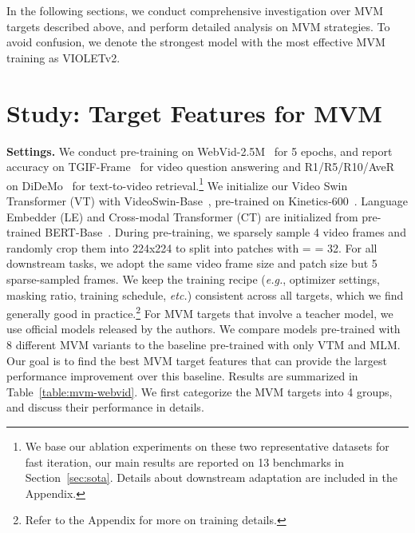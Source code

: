 \documentclass[10pt,twocolumn,letterpaper]{article}
\newcommand{\modelname}{VIOLETv2\xspace}
\begin{document}
In the following sections, we conduct comprehensive investigation over MVM targets described above, and perform detailed analysis on MVM strategies. To avoid confusion, we denote the strongest model with the most effective MVM training as \modelname. \section{Study: Target Features for MVM} \label{sec:study}
\noindent \textbf{Settings.} We conduct pre-training on WebVid-2.5M~\cite{bain2021frozen} for 5 epochs, and report accuracy on TGIF-Frame~\cite{jang2017tgif-qa} for video question answering and R1/R5/R10/AveR on DiDeMo~\cite{hendricks2017didemo} for text-to-video retrieval.\footnote{We base our ablation experiments on these two representative datasets for fast iteration, our main results are reported on 13 benchmarks in Section~\ref{sec:sota}. Details about downstream adaptation are included in the Appendix.} We initialize our Video Swin Transformer (VT) with VideoSwin-Base~\cite{liu2022video-swin}, pre-trained on Kinetics-600~\cite{kay2017kinetics}. Language Embedder (LE) and Cross-modal Transformer (CT) are initialized from pre-trained BERT-Base~\cite{devlin2019bert}. During pre-training, we sparsely sample  4 video frames and randomly crop them into 224x224 to split into patches with  =  = 32. For all downstream tasks, we adopt the same video frame size and patch size but 5 sparse-sampled frames. We keep the training recipe (\textit{e.g.}, optimizer settings, masking ratio, training schedule, \emph{etc.}) consistent across all targets, which we find generally good in practice.\footnote{Refer to the Appendix for more on training details.} For MVM targets that involve a teacher model, we use official models released by the authors. We compare models pre-trained with 8 different MVM variants to the baseline pre-trained with only VTM and MLM. Our goal is to find the best MVM target features that can provide the largest performance improvement over this baseline. Results are summarized in Table~\ref{table:mvm-webvid}. We first categorize the MVM targets into 4 groups, and discuss their performance in details.
\end{document}
